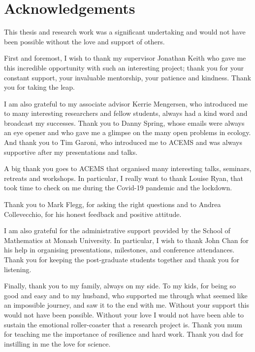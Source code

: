 \section*{Acknowledgements}

\newlength\oldparskip
\setlength{\oldparskip}{\parskip}
\setlength{\parskip}{1cm}


This thesis and research work was a significant undertaking and would not have been possible without the love and support of others.

First and foremost, I wish to thank my supervisor Jonathan Keith who gave me this incredible opportunity with such an interesting project; thank you for your constant support, your invaluable mentorship, your patience and kindness. Thank you for taking the leap.

I am also grateful to my associate advisor Kerrie Mengersen, who introduced me to many interesting researchers and fellow students, always had a kind word and broadcast my successes.
Thank you to Danny Spring, whose emails were always an eye opener and who gave me a glimpse on the many open problems in ecology. And thank you to Tim Garoni, who introduced me to ACEMS and was always supportive after my presentations and talks.

A big thank you goes to ACEMS that organised many interesting talks, seminars, retreats and workshops. In particular, I really want to thank Louise Ryan, that took time to check on me during the Covid-19 pandemic and the lockdown.

Thank you to Mark Flegg, for asking the right questions and to Andrea Collevecchio, for his honest feedback and positive attitude.

I am also grateful for the administrative support provided by the School of Mathematics at Monash University. In particular, I wish to thank John Chan for his help in organising presentations, milestones, and conference attendances. Thank you for keeping the post-graduate students together and thank you for listening.

Finally, thank you to my family, always on my side. To my kids, for being so good and easy and to my husband, who supported me through what seemed like an impossible journey, and saw it to the end with me. Without your support this would not have been possible. Without your love I would not have been able to sustain the emotional roller-coaster that a research project is.
Thank you mum for teaching me the importance of resilience and hard work.
Thank you dad for instilling in me the love for science.


%


\setlength{\parskip}{\oldparskip}
